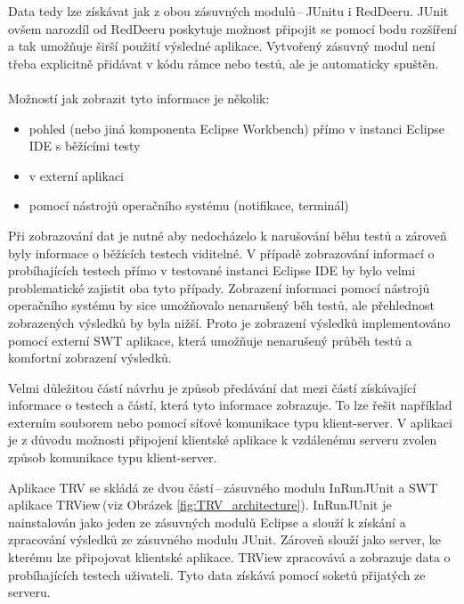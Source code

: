   Data tedy lze získávat jak z obou zásuvných modulů\,--\,JUnitu i RedDeeru. JUnit ovšem narozdíl od RedDeeru poskytuje možnost připojit se pomocí bodu rozšíření \texttt{} a tak umožňuje širší použití výsledné aplikace. Vytvořený zásuvný modul není třeba explicitně přidávat v kódu rámce nebo testů, ale je automaticky spuštěn.
  \\
  \\
  \noindent
  Možností jak zobrazit tyto informace je několik:
  \begin{itemize}
   \item pohled (nebo jiná komponenta Eclipse Workbench) přímo v instanci Eclipse IDE s běžícími testy
   \item v externí aplikaci
   \item pomocí nástrojů operačního systému (notifikace, terminál)
  \end{itemize}

  Při zobrazování dat je nutné aby nedocházelo k narušování běhu testů a zároveň byly informace o běžících testech viditelné. V případě zobrazování informací o probíhajících testech přímo v testované instanci Eclipse IDE by bylo velmi problematické zajistit oba tyto případy. Zobrazení informaci pomocí nástrojů operačního systému by sice umožňovalo nenarušený běh testů, ale přehlednost zobrazených výsledků by byla nižší. Proto je zobrazení výsledků implementováno pomocí externí SWT aplikace, která umožňuje nenarušený průběh testů a komfortní zobrazení výsledků.

  Velmi důležitou částí návrhu je způsob předávání dat mezi částí získávající informace o testech a částí, která tyto informace zobrazuje. To lze řešit například externím souborem nebo pomocí síťové komunikace typu klient-server. V aplikaci je z důvodu možnosti připojení klientské aplikace k vzdálenému serveru zvolen způsob komunikace typu klient-server.

  Aplikace TRV se skládá ze dvou částí\,--\,zásuvného modulu InRunJUnit a SWT aplikace TRView\,(viz Obrázek \ref{fig:TRV_architecture}). InRunJUnit je nainstalován jako jeden ze zásuvných modulů Eclipse a slouží k získání a zpracování výsledků ze zásuvného modulu JUnit. Zároveň slouží jako server, ke kterému lze připojovat klientské aplikace. TRView zpracovává a zobrazuje data o probíhajících testech uživateli. Tyto data získává pomocí soketů přijatých ze serveru.


